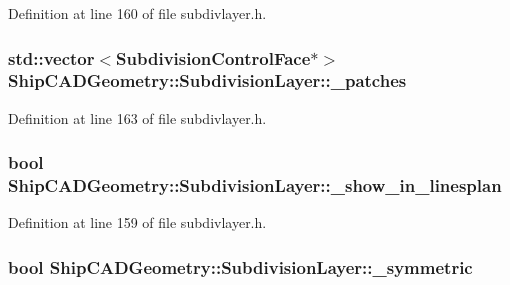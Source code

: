 Definition at line 160 of file subdivlayer.\-h.

\hypertarget{classShipCADGeometry_1_1SubdivisionLayer_ae352b98eddb1f238a61f91417f9649dd}{
\subsubsection[{\-\_\-patches}]{\setlength{\rightskip}{0pt plus 5cm}std\-::vector$<${\bf Subdivision\-Control\-Face}$\ast$$>$ Ship\-C\-A\-D\-Geometry\-::\-Subdivision\-Layer\-::\-\_\-patches\hspace{0.3cm}{\ttfamily [protected]}}}\label{classShipCADGeometry_1_1SubdivisionLayer_ae352b98eddb1f238a61f91417f9649dd}


Definition at line 163 of file subdivlayer.\-h.

\hypertarget{classShipCADGeometry_1_1SubdivisionLayer_afcd5fafc70f5c2ab0daf579c55f36dc5}{
\subsubsection[{\-\_\-show\-\_\-in\-\_\-linesplan}]{\setlength{\rightskip}{0pt plus 5cm}bool Ship\-C\-A\-D\-Geometry\-::\-Subdivision\-Layer\-::\-\_\-show\-\_\-in\-\_\-linesplan\hspace{0.3cm}{\ttfamily [protected]}}}\label{classShipCADGeometry_1_1SubdivisionLayer_afcd5fafc70f5c2ab0daf579c55f36dc5}


Definition at line 159 of file subdivlayer.\-h.

\hypertarget{classShipCADGeometry_1_1SubdivisionLayer_aff0dc8cd1738cf77e4d9f21e32e1e871}{
\subsubsection[{\-\_\-symmetric}]{\setlength{\rightskip}{0pt plus 5cm}bool Ship\-C\-A\-D\-Geometry\-::\-Subdivision\-Layer\-::\-\_\-symmetric\hspace{0.3cm}{\ttfamily [protected]}}}\label{classShipCADGeometry_1_1SubdivisionLayer_aff0dc8cd1738cf77e4d9f21e32e1e871}


